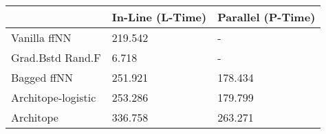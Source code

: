 \begin{tabular}{lll}
\toprule
{} & In-Line (L-Time) & Parallel (P-Time) \\
\midrule
Vanilla ffNN       &          219.542 &                 - \\
Grad.Bstd Rand.F   &            6.718 &                 - \\
Bagged ffNN        &          251.921 &           178.434 \\
Architope-logistic &          253.286 &           179.799 \\
Architope          &          336.758 &           263.271 \\
\bottomrule
\end{tabular}
